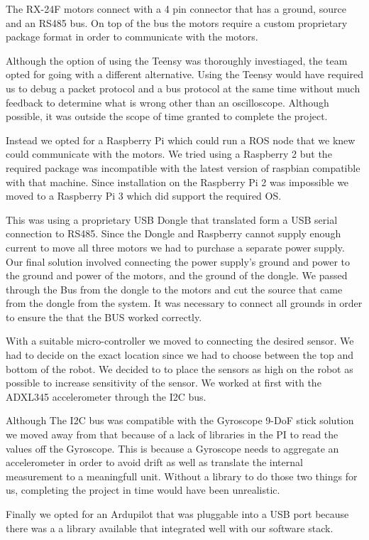 \documentclass[12pt,conference,onecolumn,titlepage]{IEEEtran} %
\begin{document}
The RX-24F motors connect with a 4 pin connector that has a ground, source and an RS485 bus. On top of the bus the motors require a custom proprietary package format in order to communicate with the motors.\par
Although the option of using the Teensy was thoroughly investiaged, the team opted for going with a different alternative. Using the Teensy would have required us to debug a packet protocol and a bus protocol at the same time without much feedback to determine what is wrong other than an oscilloscope. Although possible, it was outside the scope of time granted to complete the project. \par
Instead we opted for a Raspberry Pi which could run a ROS node that we knew could communicate with the motors. We tried using a Raspberry 2 but the required package was incompatible with the latest version of raspbian compatible with that machine. Since installation on the Raspberry Pi 2 was impossible we moved to a Raspberry Pi 3 which did support the required OS.\par
This was using a proprietary USB Dongle that translated form a USB serial connection to RS485. Since the Dongle and Raspberry cannot supply enough current to move all three motors we had to purchase a separate power supply. Our final solution involved connecting the power supply's ground and power to the ground and power of the motors, and the ground of the dongle. We passed through the Bus from the dongle to the motors and cut the source that came from the dongle from  the system. It was necessary to connect all grounds in order to ensure the that the BUS worked correctly.\par
With a suitable micro-controller we moved to connecting the desired sensor. We had to decide on the exact location since we had to choose between the top and bottom of the robot. We decided to to place the sensors as high on the robot as possible to increase sensitivity of the sensor. We worked at first with the ADXL345 accelerometer through the I2C bus.\par
Although The I2C bus was compatible with the Gyroscope 9-DoF stick solution we moved away from that because of a lack of libraries in the PI to read the values off the Gyroscope. This is because a Gyroscope needs to aggregate an accelerometer in order to avoid drift as well as translate the internal measurement to a meaningfull unit. Without a library to do those two things for us, completing the project in time would have been unrealistic. \par
Finally we opted for an Ardupilot that was pluggable into a USB port because there was a a library available that integrated well with our software stack.\par
\end{document}
